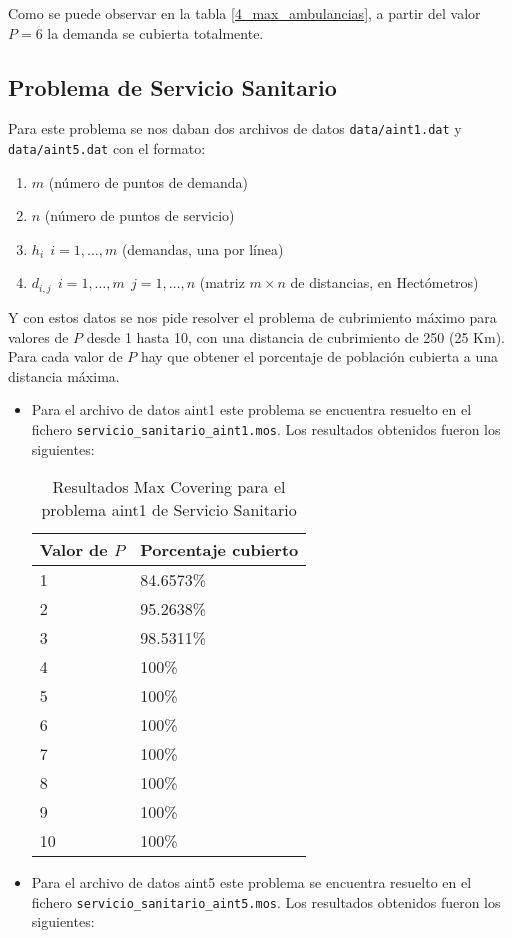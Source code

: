 \documentclass[a4paper,11pt]{article}
\begin{document}
Como se puede observar en la tabla \ref{4_max_ambulancias}, a partir del valor ${P=6}$ la demanda se cubierta totalmente.

\newpage
\subsection{Problema de Servicio Sanitario}
Para este problema se nos daban dos archivos de datos \texttt{data/aint1.dat} y \texttt{data/aint5.dat} con el formato:

\begin{enumerate}
\item ${m}$ (número de puntos de demanda)
\item ${n}$ (número de puntos de servicio)
\item ${h_i		\ \ i=1,\ldots,m}$ (demandas, una por línea)
\item ${d_{i,j}	\ \ i=1,\ldots,m \ \ j=1,\ldots,n}$ (matriz ${m \times n}$ de distancias, en Hectómetros)
\end{enumerate}

Y con estos datos se nos pide resolver el problema de cubrimiento máximo para valores de ${P}$ desde 1 hasta 10, con una distancia de cubrimiento de 250 (25 Km). Para cada valor de ${P}$ hay que obtener el porcentaje de población cubierta a una distancia máxima.

\begin{itemize}
\item Para el archivo de datos aint1 este problema se encuentra resuelto en el fichero \texttt{servicio\_sanitario\_aint1.mos}. Los resultados obtenidos fueron los siguientes:

\begin{table}[!htbp]
\label{4_max_servicio_sanitario}
\centering
\begin{tabular}{|l|l|}
\hline
Valor de ${P}$	& Porcentaje cubierto	\\ \hline
1	& 84.6573\%	\\ \hline
2	& 95.2638\%	\\ \hline
3	& 98.5311\%	\\ \hline
4	& 100\%		\\ \hline
5	& 100\%		\\ \hline
6	& 100\%		\\ \hline
7	& 100\%		\\ \hline
8	& 100\%		\\ \hline
9	& 100\%		\\ \hline
10	& 100\%		\\ \hline
\end{tabular}
\caption{Resultados Max Covering para el problema aint1 de Servicio Sanitario}
\end{table}

\item Para el archivo de datos aint5 este problema se encuentra resuelto en el fichero \texttt{servicio\_sanitario\_aint5.mos}. Los resultados obtenidos fueron los siguientes:
\end{itemize}
\end{document}
